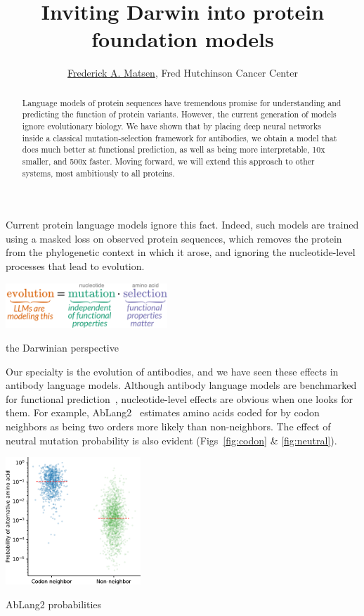 \documentclass[nobib]{tufte-handout}
\title{Inviting Darwin into protein foundation models}
\author{\href{http://matsen.fredhutch.org/}{Frederick A. Matsen}, Fred Hutchinson Cancer Center}
\begin{document}
\maketitle

\begin{abstract}
\noindent
Language models of protein sequences have tremendous promise for understanding and predicting the function of protein variants.
However, the current generation of models ignore evolutionary biology.
We have shown that by placing deep neural networks inside a classical mutation-selection framework for antibodies, we obtain a model that does much better at functional prediction, as well as being more interpretable, 10x smaller, and 500x faster.
Moving forward, we will extend this approach to other systems, most ambitiously to all proteins.
\end{abstract}

Current protein language models ignore this fact.
Indeed, such models are trained using a masked loss on observed protein sequences, which removes the protein from the phylogenetic context in which it arose, and ignoring the nucleotide-level processes that lead to evolution.

\begin{marginfigure}[-9.9cm]%
  \hspace{-19pt}
  \includegraphics[width=2.4in]{figures/evolution-is-mut-and-sel.why.pdf}%
  \caption{the Darwinian perspective}
  \label{fig:darwin}
\end{marginfigure}

Our specialty is the evolution of antibodies, and we have seen these effects in antibody language models.
Although antibody language models are benchmarked for functional prediction~\cite{Chungyoun2024-fc}, nucleotide-level effects are obvious when one looks for them.
For example, AbLang2~\cite{Olsen2024-ablang2} estimates amino acids coded for by codon neighbors as being two orders more likely than non-neighbors.
The effect of neutral mutation probability is also evident (Figs~\ref{fig:codon} \& \ref{fig:neutral}).

\begin{marginfigure}[-7.8cm]%
  \hspace{-19pt}
  \includegraphics[width=2.0in]{figures/ablang2-neighbor-csp.pdf}%
  \caption{AbLang2 probabilities}
  \label{fig:codon}
\end{marginfigure}
\end{document}
